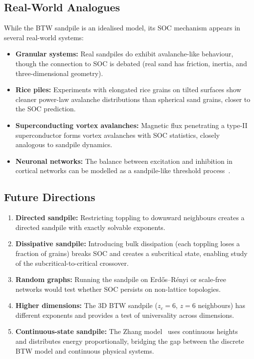 \documentclass[preprint,12pt]{elsarticle}
\begin{document}
\subsection{Real-World Analogues}

While the BTW sandpile is an idealised model, its SOC mechanism
appears in several real-world systems:
\begin{itemize}[leftmargin=2em]
  \item \textbf{Granular systems:} Real sandpiles do exhibit
        avalanche-like behaviour, though the connection to SOC is
        debated (real sand has friction, inertia, and three-dimensional
        geometry).
  \item \textbf{Rice piles:} Experiments with elongated rice grains
        on tilted surfaces show cleaner power-law avalanche
        distributions than spherical sand grains, closer to the
        SOC prediction.
  \item \textbf{Superconducting vortex avalanches:} Magnetic flux
        penetrating a type-II superconductor forms vortex avalanches
        with SOC statistics, closely analogous to sandpile dynamics.
  \item \textbf{Neuronal networks:} The balance between excitation
        and inhibition in cortical networks can be modelled as a
        sandpile-like threshold
        process~\cite{Levina2007,Beggs2003}.
\end{itemize}

\subsection{Future Directions}

\begin{enumerate}
  \item \textbf{Directed sandpile:} Restricting toppling to downward
        neighbours creates a directed sandpile with exactly solvable
        exponents.
  \item \textbf{Dissipative sandpile:} Introducing bulk dissipation
        (each toppling loses a fraction of grains) breaks SOC and
        creates a subcritical state, enabling study of the
        subcritical-to-critical crossover.
  \item \textbf{Random graphs:} Running the sandpile on
        Erd\H{o}s--R\'enyi or scale-free networks would test
        whether SOC persists on non-lattice topologies.
  \item \textbf{Higher dimensions:} The 3D BTW sandpile ($z_c=6$,
        $z=6$ neighbours) has different exponents and provides a
        test of universality across dimensions.
  \item \textbf{Continuous-state sandpile:} The Zhang
        model~\cite{Zhang1989} uses continuous heights and
        distributes energy proportionally, bridging the gap
        between the discrete BTW model and continuous physical
        systems.
\end{enumerate}
\end{document}
